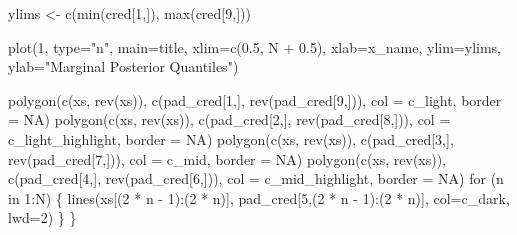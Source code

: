 \documentclass[
  letterpaper,
  DIV=11,
  numbers=noendperiod]{scrartcl}
\newenvironment{Shaded}{\begin{snugshade}}{\end{snugshade}}
\newcommand{\AttributeTok}[1]{\textcolor[rgb]{0.40,0.45,0.13}{#1}}
\newcommand{\ConstantTok}[1]{\textcolor[rgb]{0.56,0.35,0.01}{#1}}
\newcommand{\ControlFlowTok}[1]{\textcolor[rgb]{0.00,0.23,0.31}{#1}}
\newcommand{\DecValTok}[1]{\textcolor[rgb]{0.68,0.00,0.00}{#1}}
\newcommand{\FloatTok}[1]{\textcolor[rgb]{0.68,0.00,0.00}{#1}}
\newcommand{\FunctionTok}[1]{\textcolor[rgb]{0.28,0.35,0.67}{#1}}
\newcommand{\NormalTok}[1]{\textcolor[rgb]{0.00,0.23,0.31}{#1}}
\newcommand{\OtherTok}[1]{\textcolor[rgb]{0.00,0.23,0.31}{#1}}
\newcommand{\SpecialCharTok}[1]{\textcolor[rgb]{0.37,0.37,0.37}{#1}}
\newcommand{\StringTok}[1]{\textcolor[rgb]{0.13,0.47,0.30}{#1}}
\begin{document}
\begin{Shaded}
\begin{Highlighting}[]
\NormalTok{  ylims }\OtherTok{\textless{}{-}} \FunctionTok{c}\NormalTok{(}\FunctionTok{min}\NormalTok{(cred[}\DecValTok{1}\NormalTok{,]), }\FunctionTok{max}\NormalTok{(cred[}\DecValTok{9}\NormalTok{,]))}

  \FunctionTok{plot}\NormalTok{(}\DecValTok{1}\NormalTok{, }\AttributeTok{type=}\StringTok{"n"}\NormalTok{, }\AttributeTok{main=}\NormalTok{title,}
       \AttributeTok{xlim=}\FunctionTok{c}\NormalTok{(}\FloatTok{0.5}\NormalTok{, N }\SpecialCharTok{+} \FloatTok{0.5}\NormalTok{), }\AttributeTok{xlab=}\NormalTok{x\_name,}
       \AttributeTok{ylim=}\NormalTok{ylims, }\AttributeTok{ylab=}\StringTok{"Marginal Posterior Quantiles"}\NormalTok{)}

  \FunctionTok{polygon}\NormalTok{(}\FunctionTok{c}\NormalTok{(xs, }\FunctionTok{rev}\NormalTok{(xs)), }\FunctionTok{c}\NormalTok{(pad\_cred[}\DecValTok{1}\NormalTok{,], }\FunctionTok{rev}\NormalTok{(pad\_cred[}\DecValTok{9}\NormalTok{,])),}
          \AttributeTok{col =}\NormalTok{ c\_light, }\AttributeTok{border =} \ConstantTok{NA}\NormalTok{)}
  \FunctionTok{polygon}\NormalTok{(}\FunctionTok{c}\NormalTok{(xs, }\FunctionTok{rev}\NormalTok{(xs)), }\FunctionTok{c}\NormalTok{(pad\_cred[}\DecValTok{2}\NormalTok{,], }\FunctionTok{rev}\NormalTok{(pad\_cred[}\DecValTok{8}\NormalTok{,])),}
          \AttributeTok{col =}\NormalTok{ c\_light\_highlight, }\AttributeTok{border =} \ConstantTok{NA}\NormalTok{)}
  \FunctionTok{polygon}\NormalTok{(}\FunctionTok{c}\NormalTok{(xs, }\FunctionTok{rev}\NormalTok{(xs)), }\FunctionTok{c}\NormalTok{(pad\_cred[}\DecValTok{3}\NormalTok{,], }\FunctionTok{rev}\NormalTok{(pad\_cred[}\DecValTok{7}\NormalTok{,])),}
          \AttributeTok{col =}\NormalTok{ c\_mid, }\AttributeTok{border =} \ConstantTok{NA}\NormalTok{)}
  \FunctionTok{polygon}\NormalTok{(}\FunctionTok{c}\NormalTok{(xs, }\FunctionTok{rev}\NormalTok{(xs)), }\FunctionTok{c}\NormalTok{(pad\_cred[}\DecValTok{4}\NormalTok{,], }\FunctionTok{rev}\NormalTok{(pad\_cred[}\DecValTok{6}\NormalTok{,])),}
          \AttributeTok{col =}\NormalTok{ c\_mid\_highlight, }\AttributeTok{border =} \ConstantTok{NA}\NormalTok{)}
  \ControlFlowTok{for}\NormalTok{ (n }\ControlFlowTok{in} \DecValTok{1}\SpecialCharTok{:}\NormalTok{N) \{}
    \FunctionTok{lines}\NormalTok{(xs[(}\DecValTok{2} \SpecialCharTok{*}\NormalTok{ n }\SpecialCharTok{{-}} \DecValTok{1}\NormalTok{)}\SpecialCharTok{:}\NormalTok{(}\DecValTok{2} \SpecialCharTok{*}\NormalTok{ n)], pad\_cred[}\DecValTok{5}\NormalTok{,(}\DecValTok{2} \SpecialCharTok{*}\NormalTok{ n }\SpecialCharTok{{-}} \DecValTok{1}\NormalTok{)}\SpecialCharTok{:}\NormalTok{(}\DecValTok{2} \SpecialCharTok{*}\NormalTok{ n)],}
          \AttributeTok{col=}\NormalTok{c\_dark, }\AttributeTok{lwd=}\DecValTok{2}\NormalTok{)}
\NormalTok{  \}}
\NormalTok{\}}
\end{Highlighting}
\end{Shaded}
\end{document}
